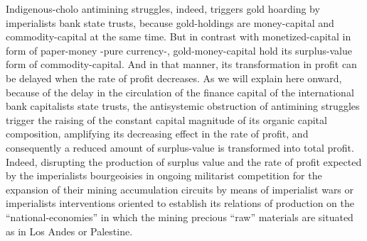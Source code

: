 \documentclass[]{interact}
\theoremstyle{plain}%
\theoremstyle{definition}
\theoremstyle{remark}
\begin{document}
Indigenous-cholo antimining struggles, indeed, triggers gold hoarding by imperialists bank state trusts, because gold-holdings are money-capital and commodity-capital at the same time. But in contrast with monetized-capital in form of paper-money -pure currency-, gold-money-capital hold its surplus-value form of commodity-capital. And in that manner, its transformation in profit can be delayed when the rate of profit decreases. As we will explain here onward, because of the delay in the circulation of the finance capital of the international bank capitalists state trusts, the antisystemic obstruction of antimining struggles trigger the raising of the constant capital magnitude of its organic capital composition, amplifying its decreasing effect in the rate of profit, and consequently a reduced amount of surplus-value is transformed into total profit. Indeed, disrupting the production of surplus value and the rate of profit expected by the imperialists bourgeoisies in ongoing militarist competition for the expansion of their mining accumulation circuits by means of imperialist wars or imperialists interventions oriented to establish its relations of production on the “national-economies” in which the mining precious “raw” materials are situated as in Los Andes or Palestine.
\end{document}
